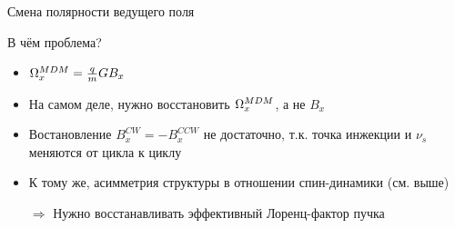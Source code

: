 \documentclass[14pt]{beamer}
\begin{document}
\begin{frame}{Смена полярности ведущего поля}
\end{frame}
\begin{frame}{В чём проблема?}
	\begin{itemize}[<+->]
		\item $\Omega_x^{MDM} = \frac qmGB_x$
		\item На самом деле, нужно восстановить $\Omega_x^{MDM}$, а не $B_x$
		\item Востановление $B_x^{CW} = -B_x^{CCW}$ не достаточно, т.к. точка инжекции и $\nu_s$ меняются от цикла к циклу
		\item К тому же, асимметрия структуры в отношении спин-динамики (см. выше)
		\item[$\Rightarrow$] Нужно восстанавливать эффективный Лоренц-фактор пучка
	\end{itemize}
\end{frame}
\end{document}
